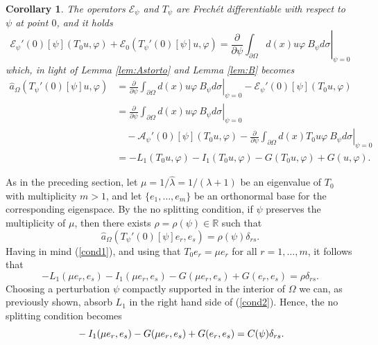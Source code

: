 \documentclass[a4paper,reqno,11pt,oneside]{amsart}
\theoremstyle{plain}
\theoremstyle{plain}
\theoremstyle{plain}
\newtheorem{corollary}[thm]{Corollary}
\theoremstyle{remark}
\begin{document}
 \begin{corollary}
The operators  $\mathcal{E}_\psi$ and $T_\psi$ are Frechét differentiable 
with respect to $\psi$ at point $0$, and it holds 
\begin{equation*}
    \mathcal{E}_\psi'(0)[\psi] (T_0 u,\varphi)+
      \mathcal{E}_0 (T_\psi '(0)[\psi] u,\varphi)=\left. \frac{\partial}{\partial \psi}\int_{\partial \Omega}d(x)  u\varphi\ B_\psi d\sigma\right|_{\psi=0}
\end{equation*} 
which, in light of Lemma \ref{lem:Astorto} and Lemma \ref{lem:B} becomes
\begin{equation}\begin{aligned}\label{cond1}
   \hat a_\Omega  (T_\psi '(0)[\psi] u,\varphi)&=\left. \frac{\partial}{\partial \psi}\int_{\partial \Omega}d(x)  u\varphi\ B_\psi d\sigma\right|_{\psi=0}
- \mathcal{E}_\psi'(0)[\psi] (T_0 u,\varphi)
\\
&=\left. \frac{\partial}{\partial \psi}\int_{\partial \Omega}d(x)  u\varphi\ B_\psi d\sigma\right|_{\psi=0}\\ &\quad
- \mathcal{A}_\psi'(0)[\psi] (T_0 u,\varphi)
-\left. \frac{\partial}{\partial \psi}\int_{\partial \Omega}d(x) T_0 u\varphi\ B_\psi d\sigma\right|_{\psi=0}
\\ & =-L_1( T_0u, \varphi)-
I_1( T_0u, \varphi)
-G(T_0 u, \varphi)+G(u,\varphi).
\end{aligned}\end{equation}
\end{corollary}

As in the preceding section, let $\mu=1/\hat \lambda=1/(\lambda +1)$ be an eigenvalue of $T_0$ with multiplicity $m>1$, and let $\{e_1, \dots,e_m \}$ be an orthonormal base for the corresponding  eigenspace. By the no splitting condition, if $\psi$ preserves the multiplicity of $\mu$, then there exists $\rho=\rho(\psi)\in \mathbb{R}$ such that
$$
    \hat   a_\Omega  (T_\psi '(0)[\psi] e_r,e_s)=  \rho(\psi)\delta_{rs}.
$$
Having in mind (\ref{cond1}), and using that $T_0e_r=\mu e_r$ for all $r=1,\dots,m$, it follows that
\begin{equation}
    \label{cond2}
    -L_1(\mu e_r,e_s)-
I_1(\mu  e_r,e_s)
-G(\mu  e_r, e_s)+G( e_r,e_s)=\rho\delta_{rs}.
\end{equation}
Choosing a perturbation $\psi$ compactly supported in the interior of $\Omega$ we can, as previously shown, absorb $L_1$  in the right hand side of (\ref{cond2}). Hence, the no splitting condition becomes
 \begin{equation}{\label{nosplitsimp}}
    -I_1( \mu e_r,e_s)
-G( \mu e_r, e_s)+G(e_r,e_s)=C(\psi)\delta_{rs}.
\end{equation}
\end{document}
